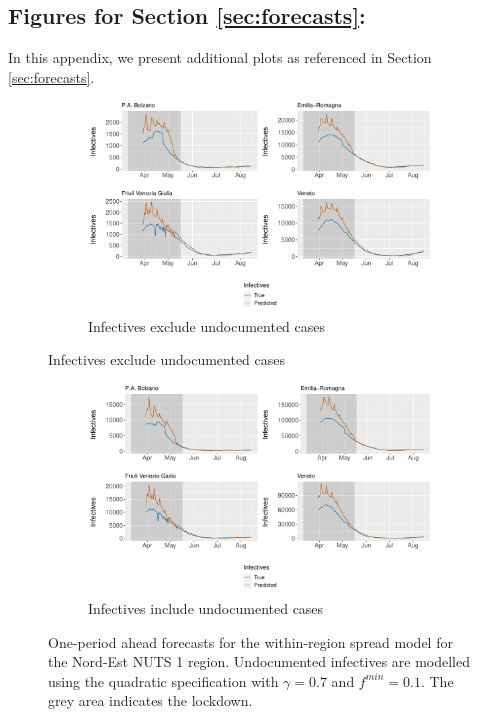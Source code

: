 \documentclass[12pt]{article}
\begin{document}
\begin{appendices}
		\newpage
		\subsection{Figures for Section \ref{sec:forecasts}: } \label{sapp:figures_forecasts}
		In this appendix, we present additional plots as referenced in Section \ref{sec:forecasts}.
		
		\begin{figure}[H]
    	    \centering
    	    \begin{subfigure}{\textwidth}
    	      \centering
    	      \includegraphics[width=0.85\linewidth]{output/model_within_lag14_forecast_start20_Nord-Est_rolling.pdf}
    	      \caption{Infectives exclude undocumented cases}
    	      \label{fig:forecast_within_nordest_regular}
    	    \end{subfigure}
        \end{figure}
        \begin{figure}[H]\ContinuedFloat
    	    \begin{subfigure}{\textwidth}
    	      \centering
    	      \includegraphics[width=0.85\linewidth]{output/model_within_lag14_forecast_start20_Nord-Est_UndocQuadratic_rolling.pdf}
    	      \caption{Infectives include undocumented cases}
    	      \label{fig:forecast_within_nordest_undoc}
    	    \end{subfigure}
    	    \caption{One-period ahead forecasts for the within-region spread model for the Nord-Est NUTS 1 region. Undocumented infectives are modelled using the quadratic specification with $\gamma = 0.7$ and $f^{min}=0.1$. The grey area indicates the lockdown.}
    	    \label{fig:forecast_within_nordest}
        \end{figure}
		

\end{appendices}
\end{document}
